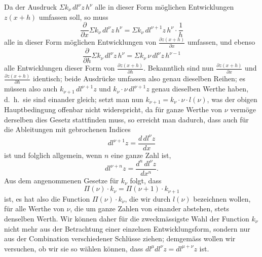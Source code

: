 \documentclass[12pt,a4paper]{article}
\begin{document}
Da der Ausdruck $\Sigma k_\nu \, dl^\nu z \, h^\nu$ alle in dieser Form m\"oglichen Entwicklungen $z(x+h)$ umfassen soll, so muss
\[
\frac{\partial}{\partial x}\Sigma k_\nu \, dl^\nu z \, h^\nu = \Sigma k_\nu \, dl^{\nu+1} z \, h^\nu \cdot \frac{1}{h}
\]
alle in dieser Form m\"oglichen Entwicklungen von $\frac{\partial z(x+h)}{\partial x}$ umfassen, und ebenso
\[
\frac{\partial}{\partial h}\Sigma k_\nu \, dl^\nu z \, h^\nu = \Sigma k_\nu \, \nu \, dl^\nu z \, h^{\nu-1}
\]
alle Entwicklungen dieser Form von $\frac{\partial z(x+h)}{\partial h}$. Bekanntlich sind nun $\frac{\partial z(x+h)}{\partial x}$ und $\frac{\partial z(x+h)}{\partial h}$ identisch; beide Ausdr\"ucke umfassen also genau dieselben Reihen; es m\"ussen also auch $k_{\nu+1}\,dl^{\nu+1}z$ und $k_\nu \cdot \nu \, dl^{\nu+1}z$ genau dieselben Werthe haben, d.\ h.\ sie sind einander gleich; setzt man nun $k_{\nu+1} = k_\nu \cdot \nu \cdot l(\nu)$, was der obigen Hauptbedingung offenbar nicht widerspricht, da f\"ur ganze Werthe von $\nu$ verm\"oge derselben dies Gesetz stattfinden muss, so erreicht man dadurch, dass auch f\"ur die Ableitungen mit gebrochenen Indices
\begin{equation}
dl^{\nu+1}z = \frac{d\,dl^\nu z}{dx}
\end{equation}
ist und folglich allgemein, wenn $n$ eine ganze Zahl ist,
\begin{equation}
dl^{\nu+n}z = \frac{d^n\,dl^\nu z}{dx^n}.
\end{equation}
Aus dem angenommenen Gesetze f\"ur $k_\nu$ folgt, dass
\[
\Pi(\nu) \cdot k_\nu = \Pi(\nu+1) \cdot k_{\nu+1}
\]
ist, es hat also die Function $\Pi(\nu) \cdot k_\nu$, die wir durch $l(\nu)$ bezeichnen wollen, f\"ur alle Werthe von $\nu$, die um ganze Zahlen von einander abstehen, stets denselben Werth. Wir k\"onnen daher f\"ur die zweckm\"assigste Wahl der Function $k_\nu$ nicht mehr aus der Betrachtung einer einzelnen Entwicklungsform, sondern nur aus der Combination verschiedener Schl\"usse ziehen; demgem\"ass wollen wir versuchen, ob wir sie so w\"ahlen k\"onnen, dass $dl^\mu dl^\nu z = dl^{\mu+\nu}z$ ist.
\end{document}
